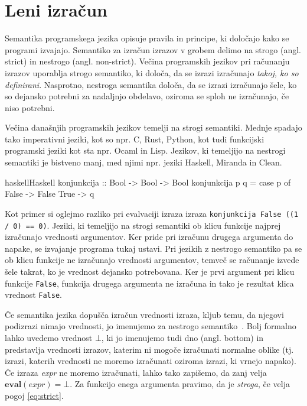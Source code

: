 \section{Leni izračun}
\label{sec:leni-izracun}

Semantika programskega jezika opisuje pravila in principe, ki določajo kako se programi izvajajo. Semantiko za izračun izrazov v grobem delimo na strogo (angl. strict) in nestrogo (angl. non-strict). Večina programskih jezikov pri računanju izrazov uporablja strogo semantiko, ki določa, da se izrazi izračunajo \textit{takoj, ko so definirani}. Nasprotno, nestroga semantika določa, da se izrazi izračunajo šele, ko so dejansko potrebni za nadaljnjo obdelavo, oziroma se sploh ne izračunajo, če niso potrebni.

Večina današnjih programskih jezikov temelji na strogi semantiki. Mednje spadajo tako imperativni jeziki, kot so npr. C, Rust, Python, kot tudi funkcijski programski jeziki kot sta npr. Ocaml in Lisp. Jezikov, ki temeljijo na nestrogi semantiki je bistveno manj, med njimi npr. jeziki Haskell, Miranda in Clean.

\begin{code-box}{haskell}{Haskell \cmark}
konjunkcija :: Bool -> Bool -> Bool
konjunkcija p q =
	case p of
		False -> False
		True -> q
\end{code-box}

Kot primer si oglejmo razliko pri evalvaciji izraza izraza \texttt{konjunkcija False ((1 / 0) == 0)}. Jeziki, ki temeljijo na strogi semantiki ob klicu funkcije najprej izračunajo vrednosti argumentov. Ker pride pri izračunu drugega argumenta do napake, se izvajanje programa tukaj ustavi. Pri jezikih z nestrogo semantiko pa se ob klicu funkcije ne izračunajo vrednosti argumentov, temveč se računanje izvede šele takrat, ko je vrednost dejansko potrebovana. Ker je prvi argument pri klicu funkcije \texttt{False}, funkcija drugega argumenta ne izračuna in tako je rezultat klica vrednost \texttt{False}.

Če semantika jezika dopušča izračun vrednosti izraza, kljub temu, da njegovi podizrazi nimajo vrednosti, jo imenujemo za nestrogo semantiko~\cite{peyton1987implementation}. Bolj formalno lahko uvedemo vrednost $\bot$, ki jo imenujemo tudi dno (angl. bottom) in predstavlja vrednosti izrazov, katerim ni mogoče izračunati normalne oblike (tj. izrazi, katerih vrednosti ne moremo izračunati oziroma izrazi, ki vrnejo napako). Če izraza \textit{expr} ne moremo izračunati, lahko tako zapišemo, da zanj velja $\textbf{eval}(expr) = \bot$. Za funkcijo enega argumenta pravimo, da je \textit{stroga}, če velja pogoj \ref{eq:strict}.

